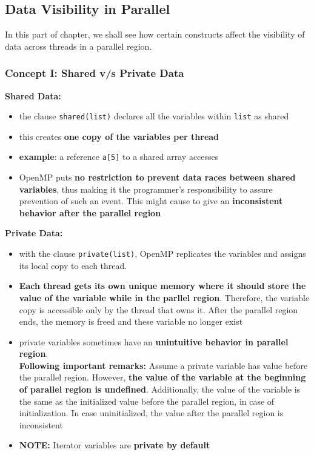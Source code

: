 \documentclass[12pt, a4paper]{report}
\begin{document}
\subsection{Data Visibility in Parallel}
In this part of chapter, we shall see how certain constructs affect the visibility of data across threads in a parallel region.

\subsubsection{Concept I: Shared v/s Private Data}
{\bfseries{Shared Data:}}
\begin{itemize}
    \item the clause {\texttt{shared(list)}} declares all the variables within {\texttt{list}} as shared
    \item this creates {\bfseries{one copy of the variables per thread}}
    \item {\bfseries{example}}: a reference {\texttt{a[5]}} to a shared array accesses
    \item OpenMP puts {\bfseries{no restriction to prevent data races between shared variables}}, thus making it the programmer's
          responsibility to assure prevention of such an event. This might cause to give an {\bfseries{inconsistent behavior after the parallel 
          region}} 
\end{itemize}

{\bfseries{Private Data:}}
\begin{itemize}
    \item with the clause \verb$private(list)$, OpenMP replicates the variables and assigns its local copy to each thread.
    \item {\bfseries{Each thread gets its own unique memory where it should store the value of the variable while in the parllel region}}.
          Therefore, the variable copy is accessible only by the thread that owns it. After the parallel region ends, the memory is freed and 
          these variable no longer exist
    \item private variables sometimes have an {\bfseries{unintuitive behavior in parallel region}}.\\
          {\bfseries{Following important remarks:}} Assume a private variable has value before the parallel region. However, {\bfseries{the value
          of the variable at the beginning of parallel region is undefined}}. Additionally, the value of the variable is the same as the 
          initialized value before the parallel region, in case of initialization. In case uninitialized, the value after the parallel region is
          inconsistent
    \item {\bfseries{NOTE:}} Iterator variables are {\bfseries{private by default}}
\end{itemize}
\end{document}
